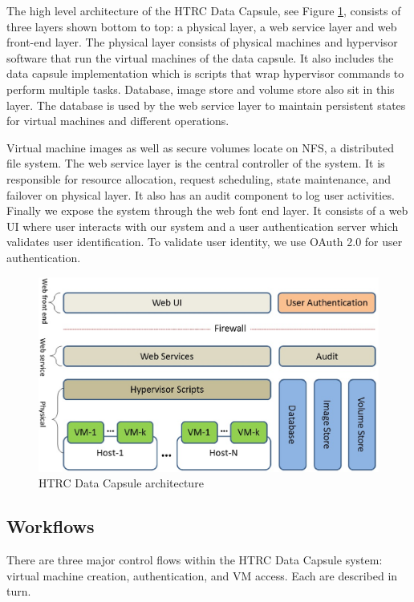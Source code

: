 \documentclass{acm_proc_article-sp}
\begin{document}
 The high level architecture of the HTRC Data Capsule, see Figure \ref{fig:architecture}, consists of three layers shown bottom to top: a physical layer, a web service layer and web front-end layer. The physical layer consists of physical machines and hypervisor software that run the virtual machines of the data capsule. It also includes the data capsule implementation which is scripts that wrap hypervisor commands to perform multiple tasks. Database, image store and volume store also sit in this layer. The database is used by the web service layer to maintain persistent states for virtual machines and different operations.

Virtual machine images as well as secure volumes locate on NFS, a distributed file system. The web service layer is the central controller of the system. It is responsible for resource allocation, request scheduling, state maintenance, and failover on physical layer. It also has an audit component to log user activities. Finally we expose the system through the web font end layer. It consists of a web UI where user interacts with our system and a user authentication server which validates user identification. To validate user identity, we use OAuth 2.0 \cite{OAuth2} for user authentication.

\begin{figure}[ht]
  \centering
  \includegraphics[scale=0.33]{figures/layers}
  \caption{HTRC Data Capsule architecture}
  \label{fig:architecture}
\end{figure}


\subsection{Workflows}

There are three major control flows within the HTRC Data Capsule system:   virtual machine creation, authentication, and VM access.  Each are described in turn.
\end{document}

